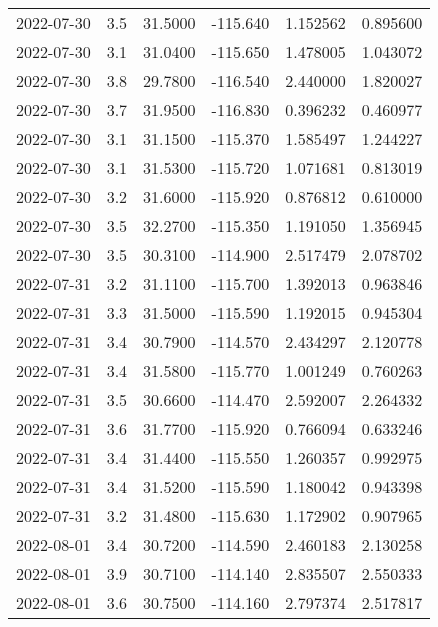 \begin{tabular}{lrrrrr}
2022-07-30 &       3.5 &  31.5000 &  -115.640 &         1.152562 &         0.895600 \\
2022-07-30 &       3.1 &  31.0400 &  -115.650 &         1.478005 &         1.043072 \\
2022-07-30 &       3.8 &  29.7800 &  -116.540 &         2.440000 &         1.820027 \\
2022-07-30 &       3.7 &  31.9500 &  -116.830 &         0.396232 &         0.460977 \\
2022-07-30 &       3.1 &  31.1500 &  -115.370 &         1.585497 &         1.244227 \\
2022-07-30 &       3.1 &  31.5300 &  -115.720 &         1.071681 &         0.813019 \\
2022-07-30 &       3.2 &  31.6000 &  -115.920 &         0.876812 &         0.610000 \\
2022-07-30 &       3.5 &  32.2700 &  -115.350 &         1.191050 &         1.356945 \\
2022-07-30 &       3.5 &  30.3100 &  -114.900 &         2.517479 &         2.078702 \\
2022-07-31 &       3.2 &  31.1100 &  -115.700 &         1.392013 &         0.963846 \\
2022-07-31 &       3.3 &  31.5000 &  -115.590 &         1.192015 &         0.945304 \\
2022-07-31 &       3.4 &  30.7900 &  -114.570 &         2.434297 &         2.120778 \\
2022-07-31 &       3.4 &  31.5800 &  -115.770 &         1.001249 &         0.760263 \\
2022-07-31 &       3.5 &  30.6600 &  -114.470 &         2.592007 &         2.264332 \\
2022-07-31 &       3.6 &  31.7700 &  -115.920 &         0.766094 &         0.633246 \\
2022-07-31 &       3.4 &  31.4400 &  -115.550 &         1.260357 &         0.992975 \\
2022-07-31 &       3.4 &  31.5200 &  -115.590 &         1.180042 &         0.943398 \\
2022-07-31 &       3.2 &  31.4800 &  -115.630 &         1.172902 &         0.907965 \\
2022-08-01 &       3.4 &  30.7200 &  -114.590 &         2.460183 &         2.130258 \\
2022-08-01 &       3.9 &  30.7100 &  -114.140 &         2.835507 &         2.550333 \\
2022-08-01 &       3.6 &  30.7500 &  -114.160 &         2.797374 &         2.517817 \\

\end{tabular}
